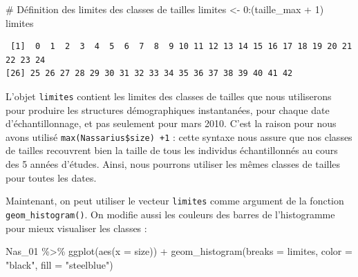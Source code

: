 \documentclass[
  a4paper,
  DIV=11,
  numbers=noendperiod,
  oneside]{scrreprt}
\newenvironment{Shaded}{}{}
\newcommand{\AttributeTok}[1]{\textcolor[rgb]{0.84,0.23,0.29}{#1}}
\newcommand{\CommentTok}[1]{\textcolor[rgb]{0.42,0.45,0.49}{#1}}
\newcommand{\DecValTok}[1]{\textcolor[rgb]{0.00,0.36,0.77}{#1}}
\newcommand{\FunctionTok}[1]{\textcolor[rgb]{0.44,0.26,0.76}{#1}}
\newcommand{\NormalTok}[1]{\textcolor[rgb]{0.14,0.16,0.18}{#1}}
\newcommand{\OtherTok}[1]{\textcolor[rgb]{0.44,0.26,0.76}{#1}}
\newcommand{\SpecialCharTok}[1]{\textcolor[rgb]{0.00,0.36,0.77}{#1}}
\newcommand{\StringTok}[1]{\textcolor[rgb]{0.01,0.18,0.38}{#1}}
\begin{document}
\begin{Shaded}
\begin{Highlighting}[]
\CommentTok{\# Définition des limites des classes de tailles}
\NormalTok{limites }\OtherTok{\textless{}{-}} \DecValTok{0}\SpecialCharTok{:}\NormalTok{(taille\_max }\SpecialCharTok{+} \DecValTok{1}\NormalTok{)}
\NormalTok{limites}
\end{Highlighting}
\end{Shaded}

\begin{verbatim}
 [1]  0  1  2  3  4  5  6  7  8  9 10 11 12 13 14 15 16 17 18 19 20 21 22 23 24
[26] 25 26 27 28 29 30 31 32 33 34 35 36 37 38 39 40 41 42
\end{verbatim}


L'objet \texttt{limites} contient les limites des classes de tailles que
nous utiliserons pour produire les structures démographiques
instantanées, pour chaque date d'échantillonnage, et pas seulement pour
mars 2010. C'est la raison pour nous avons utilisé
\texttt{max(Nassarius\$size)\ +1} : cette syntaxe nous assure que nos
classes de tailles recouvrent bien la taille de tous les individus
échantillonnés au cours des 5 années d'études. Ainsi, nous pourrons
utiliser les mêmes classes de tailles pour toutes les dates.

Maintenant, on peut utiliser le vecteur \texttt{limites} comme argument
de la fonction \texttt{geom\_histogram()}. On modifie aussi les couleurs
des barres de l'histogramme pour mieux visualiser les classes :

\begin{Shaded}
\begin{Highlighting}[]
\NormalTok{Nas\_01 }\SpecialCharTok{\%\textgreater{}\%}
  \FunctionTok{ggplot}\NormalTok{(}\FunctionTok{aes}\NormalTok{(}\AttributeTok{x =}\NormalTok{ size)) }\SpecialCharTok{+}
  \FunctionTok{geom\_histogram}\NormalTok{(}\AttributeTok{breaks =}\NormalTok{ limites, }\AttributeTok{color =} \StringTok{"black"}\NormalTok{, }\AttributeTok{fill =} \StringTok{"steelblue"}\NormalTok{)}
\end{Highlighting}
\end{Shaded}
\end{document}
